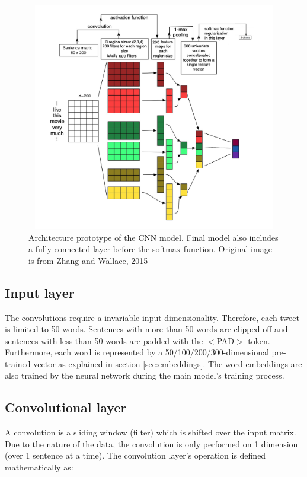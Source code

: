 \documentclass[10pt,conference,compsocconf]{IEEEtran}
\begin{document}
\begin{figure}[h]
\includegraphics[width = 12cm, height = 10cm]{cnn_arch}
\centering
\caption{Architecture prototype of the CNN model. Final model also includes a fully connected layer before the softmax function. Original image is from Zhang and Wallace, 2015 \cite{cnn_sent_classification}}
\label{fig:cnn_arch}
\end{figure}

\subsection{Input layer} \label{subsec:input_layer_cnn}

The convolutions require a invariable input dimensionality. Therefore, each tweet is limited to 50 words. Sentences with more than 50 words are clipped off and sentences with less than 50 words are padded with the $<$PAD$>$ token. 
Furthermore, each word is represented by a 50/100/200/300-dimensional pre-trained vector as explained in section \ref{sec:embeddings}. The word embeddings are also trained by the neural network during the main model's training process.

\subsection{Convolutional layer} \label{subsec:conv_layer_cnn}

A convolution is a sliding window (filter) which is shifted over the input matrix. Due to the nature of the data, the convolution is only performed on 1 dimension (over 1 sentence at a time). The convolution layer's operation is defined mathematically as:
\end{document}
